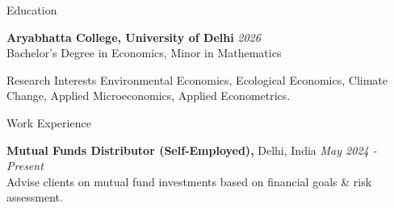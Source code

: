 \documentclass{resume} %
\begin{document}
	
	
	\begin{rSection}{Education}
		
		\textbf{Aryabhatta College, University of Delhi} \hfill \textit{2026}
		\\ Bachelor’s Degree in Economics, Minor in Mathematics
		
	\end{rSection}
	
	
	\begin{rSection}{Research Interests}
		Environmental Economics, Ecological Economics, Climate Change, Applied Microeconomics, Applied Econometrics.
	\end{rSection}
	
	\begin{rSection}{Work Experience}
		
		\textbf{Mutual Funds Distributor (Self-Employed),} Delhi, India \hfill \textit{May 2024 - Present} \\
		Advise clients on mutual fund investments based on financial goals \& risk assessment.
		
	\end{rSection}
	
	
\end{document}
